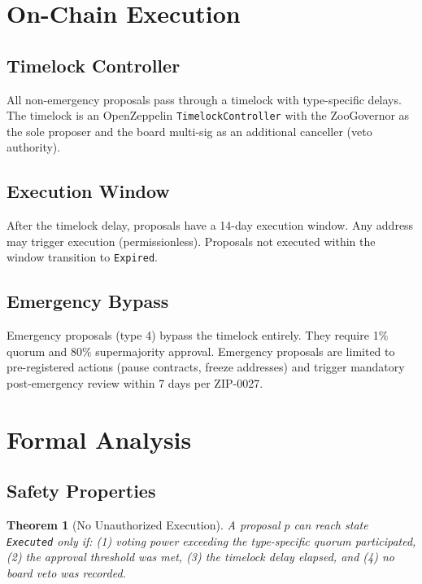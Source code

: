 \documentclass[11pt,letterpaper]{article}
\newtheorem{theorem}{Theorem}[section]
\begin{document}
\section{On-Chain Execution}
\label{sec:execution}

\subsection{Timelock Controller}

All non-emergency proposals pass through a timelock with type-specific delays. The timelock is an OpenZeppelin \texttt{TimelockController} with the ZooGovernor as the sole proposer and the board multi-sig as an additional canceller (veto authority).

\subsection{Execution Window}

After the timelock delay, proposals have a 14-day execution window. Any address may trigger execution (permissionless). Proposals not executed within the window transition to \texttt{Expired}.

\subsection{Emergency Bypass}

Emergency proposals (type 4) bypass the timelock entirely. They require 1\% quorum and 80\% supermajority approval. Emergency proposals are limited to pre-registered actions (pause contracts, freeze addresses) and trigger mandatory post-emergency review within 7 days per ZIP-0027.

\section{Formal Analysis}
\label{sec:analysis}

\subsection{Safety Properties}

\begin{theorem}[No Unauthorized Execution]
A proposal $p$ can reach state \texttt{Executed} only if: (1) voting power exceeding the type-specific quorum participated, (2) the approval threshold was met, (3) the timelock delay elapsed, and (4) no board veto was recorded.
\end{theorem}
\end{document}
